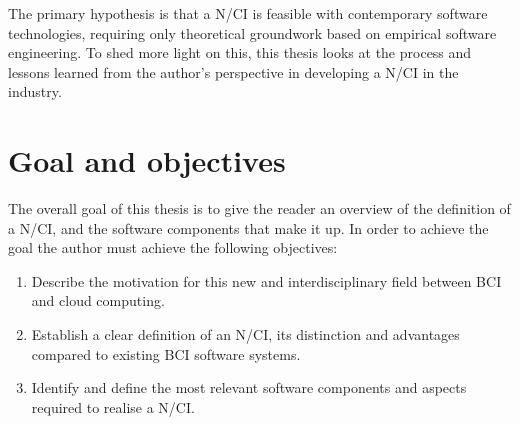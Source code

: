 The primary hypothesis is that a N/CI is feasible with contemporary software technologies, requiring only theoretical groundwork based on empirical software engineering. To shed more light on this, this thesis looks at the process and lessons learned from the author's perspective in developing a N/CI in the industry.

\section{Goal and objectives}
\label{chapter1-goal-and-objectives}

The overall goal of this thesis is to give the reader an overview of the definition of a N/CI, and the software components that make it up. In order to achieve the goal the author must achieve the following objectives:

\begin{enumerate}
  \item Describe the motivation for this new and interdisciplinary field between BCI and cloud computing.
  \item Establish a clear definition of an N/CI, its distinction and advantages compared to existing BCI software systems.
  \item Identify and define the most relevant software components and aspects required to realise a N/CI.
\end{enumerate}

